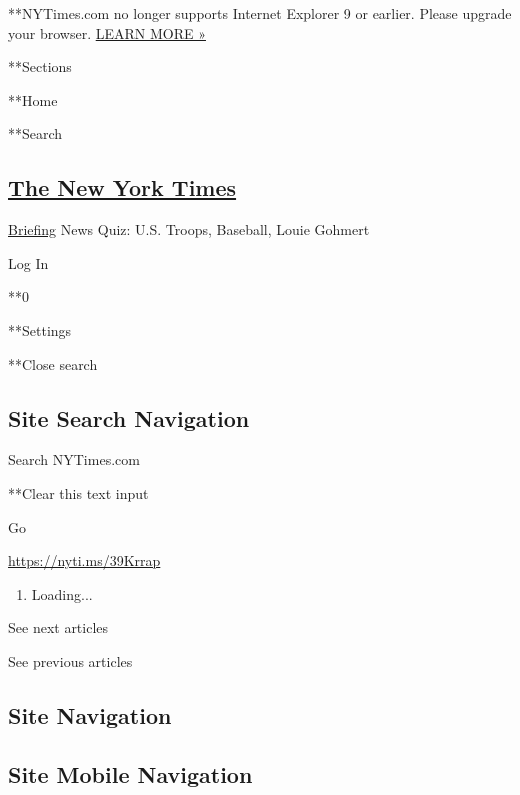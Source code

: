  **NYTimes.com no longer supports Internet Explorer 9 or earlier. Please
upgrade your browser.
\href{http://www.nytimes.com/content/help/site/ie9-support.html}{LEARN
MORE »}

**Sections

**Home

**Search

\hypertarget{the-new-york-times}{%
\subsection{\texorpdfstring{\href{http://www.nytimes.com/}{The New York
Times}}{The New York Times}}\label{the-new-york-times}}


\href{/interactive/2018/briefing/global-morning-briefing-newsletter-signup.html}{Briefing}
\textbar{}News Quiz: U.S. Troops, Baseball, Louie Gohmert

Log In

**0

**Settings

**Close search

\hypertarget{site-search-navigation}{%
\subsection{Site Search Navigation}\label{site-search-navigation}}

Search NYTimes.com

**Clear this text input

Go

\url{https://nyti.ms/39Krrap}

\begin{enumerate}
\def\labelenumi{\arabic{enumi}.}
\item
  Loading...
\end{enumerate}

See next articles

See previous articles

\hypertarget{site-navigation}{%
\subsection{Site Navigation}\label{site-navigation}}

\hypertarget{site-mobile-navigation}{%
\subsection{Site Mobile Navigation}\label{site-mobile-navigation}}

